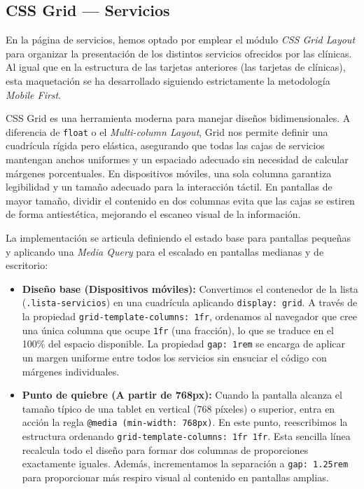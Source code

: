 \documentclass[11pt]{article}
\begin{document}
\clearpage

\subsection{CSS Grid --- Servicios}

En la página de servicios, hemos optado por emplear el módulo \textit{CSS Grid Layout} para organizar la presentación de los distintos servicios ofrecidos por las clínicas. Al igual que en la estructura de las tarjetas anteriores (las tarjetas de clínicas), esta maquetación se ha desarrollado siguiendo estrictamente la metodología \textit{Mobile First}.

CSS Grid es una herramienta moderna para manejar diseños bidimensionales. A diferencia de \texttt{float} o el \textit{Multi-column Layout}, Grid nos permite definir una cuadrícula rígida pero elástica, asegurando que todas las cajas de servicios mantengan anchos uniformes y un espaciado adecuado sin necesidad de calcular márgenes porcentuales. En dispositivos móviles, una sola columna garantiza legibilidad y un tamaño adecuado para la interacción táctil. En pantallas de mayor tamaño, dividir el contenido en dos columnas evita que las cajas se estiren de forma antiestética, mejorando el escaneo visual de la información.

La implementación se articula definiendo el estado base para pantallas pequeñas y aplicando una \textit{Media Query} para el escalado en pantallas medianas y de escritorio:

\begin{itemize}
\item \textbf{Diseño base (Dispositivos móviles):} Convertimos el contenedor de la lista (\texttt{.lista-servicios}) en una cuadrícula aplicando \texttt{display: grid}. A través de la propiedad \texttt{grid-template-columns: 1fr}, ordenamos al navegador que cree una única columna que ocupe \texttt{1fr} (una fracción), lo que se traduce en el 100\% del espacio disponible. La propiedad \texttt{gap: 1rem} se encarga de aplicar un margen uniforme entre todos los servicios sin ensuciar el código con márgenes individuales.
\item \textbf{Punto de quiebre (A partir de 768px):} Cuando la pantalla alcanza el tamaño típico de una tablet en vertical (768 píxeles) o superior, entra en acción la regla \texttt{@media (min-width: 768px)}. En este punto, reescribimos la estructura ordenando \texttt{grid-template-columns: 1fr 1fr}. Esta sencilla línea recalcula todo el diseño para formar dos columnas de proporciones exactamente iguales. Además, incrementamos la separación a \texttt{gap: 1.25rem} para proporcionar más respiro visual al contenido en pantallas amplias.
\end{itemize}
\end{document}
